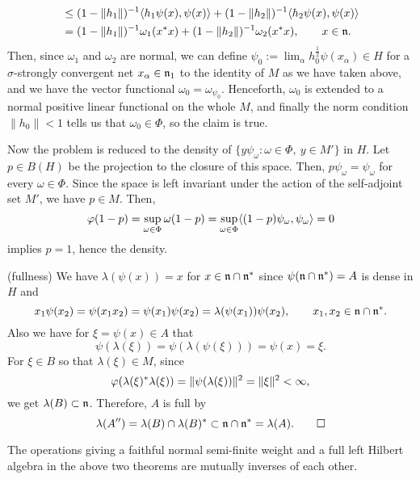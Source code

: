 \documentclass{../../small}
\begin{document}
\begin{pf}
\begin{align*}
&\le(1-\|h_1\|)^{-1}\langle h_1\psi(x),\psi(x)\rangle+(1-\|h_2\|)^{-1}\langle h_2\psi(x),\psi(x)\rangle\\
&=(1-\|h_1\|)^{-1}\omega_1(x^*x)+(1-\|h_2\|)^{-1}\omega_2(x^*x),\qquad x\in\mathfrak{n}.
\end{align*}
Then, since $\omega_1$ and $\omega_2$ are normal, we can define $\psi_0:=\lim_\alpha h_0^{\frac12}\psi(x_\alpha)\in H$ for a $\sigma$-strongly convergent net $x_\alpha\in\mathfrak{n}_1$ to the identity of $M$ as we have taken above, and we have the vector functional $\omega_0=\omega_{\psi_0}$.
Henceforth, $\omega_0$ is extended to a normal positive linear functional on the whole $M$, and finally the norm condition $\|h_0\|<1$ tells us that $\omega_0\in\Phi$, so the claim is true.

Now the problem is reduced to the density of $\{y\psi_{\omega}:\omega\in\Phi,\ y\in M'\}$ in $H$.
Let $p\in B(H)$ be the projection to the closure of this space.
Then, $p\psi_\omega=\psi_\omega$ for every $\omega\in\Phi$.
Since the space is left invariant under the action of the self-adjoint set $M'$, we have $p\in M$.
Then,
\[\varphi(1-p)=\sup_{\omega\in\Phi}\omega(1-p)=\sup_{\omega\in\Phi}\langle(1-p)\psi_\omega,\psi_\omega\rangle=0\]
implies $p=1$, hence the density.

(fullness)
We have $\lambda(\psi(x))=x$ for $x\in\mathfrak{n}\cap\mathfrak{n}^*$ since $\psi(\mathfrak{n}\cap\mathfrak{n}^*)=A$ is dense in $H$ and
\[x_1\psi(x_2)=\psi(x_1x_2)=\psi(x_1)\psi(x_2)=\lambda(\psi(x_1))\psi(x_2),\qquad x_1,x_2\in\mathfrak{n}\cap\mathfrak{n}^*.\]
Also we have for $\xi=\psi(x)\in A$ that
\[\psi(\lambda(\xi))=\psi(\lambda(\psi(\xi)))=\psi(x)=\xi.\]
For $\xi\in B$ so that $\lambda(\xi)\in M$, since
\[\varphi(\lambda(\xi)^*\lambda(\xi))=\|\psi(\lambda(\xi))\|^2=\|\xi\|^2<\infty,\]
we get $\lambda(B)\subset\mathfrak{n}$.
Therefore, $A$ is full by
\[\lambda(A'')=\lambda(B)\cap\lambda(B)^*\subset\mathfrak{n}\cap\mathfrak{n}^*=\lambda(A).\qedhere\]
\end{pf}

\begin{cor}
The operations giving a faithful normal semi-finite weight and a full left Hilbert algebra in the above two theorems are mutually inverses of each other.
\end{cor}
\end{document}
